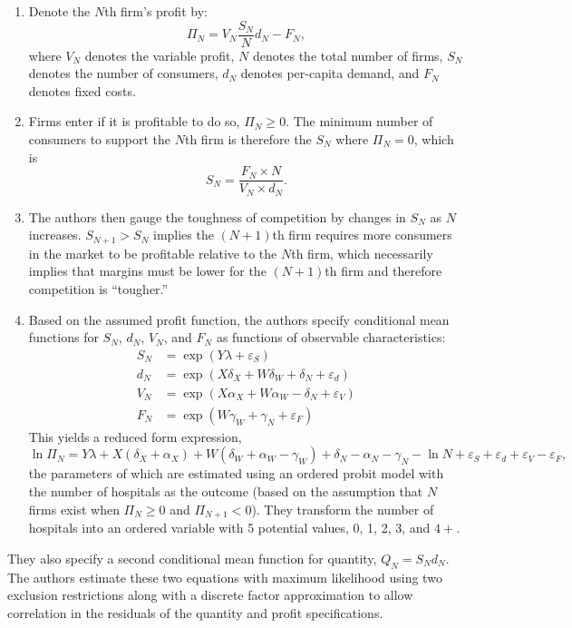 \documentclass[
  letterpaper,
  DIV=11,
  numbers=noendperiod]{scrreport}
\theoremstyle{definition}
\theoremstyle{remark}
\begin{document}
\begin{enumerate}
\def\labelenumi{\arabic{enumi}.}
\item
  Denote the \(N\)th firm's profit by:
  \[\Pi_{N}=V_{N}\frac{S_{N}}{N}d_{N} - F_{N},\] where \(V_{N}\) denotes
  the variable profit, \(N\) denotes the total number of firms,
  \(S_{N}\) denotes the number of consumers, \(d_{N}\) denotes
  per-capita demand, and \(F_{N}\) denotes fixed costs.
\item
  Firms enter if it is profitable to do so, \(\Pi_{N}\geq 0\). The
  minimum number of consumers to support the \(N\)th firm is therefore
  the \(S_{N}\) where \(\Pi_{N}=0\), which is
  \[S_{N}=\frac{F_{N}\times N}{V_{N}\times d_{N}}.\]
\item
  The authors then gauge the toughness of competition by changes in
  \(S_{N}\) as \(N\) increases. \(S_{N+1}>S_{N}\) implies the
  \((N+1)\)th firm requires more consumers in the market to be
  profitable relative to the \(N\)th firm, which necessarily implies
  that margins must be lower for the \((N+1)\)th firm and therefore
  competition is ``tougher.''
\item
  Based on the assumed profit function, the authors specify conditional
  mean functions for \(S_{N}\), \(d_{N}\), \(V_{N}\), and \(F_{N}\) as
  functions of observable characteristics: \[\begin{align*}
    S_{N} &= \exp \left(Y\lambda + \varepsilon_{S}\right) \\
    d_{N} &= \exp \left(X\delta_{X} + W\delta_{W} + \delta_{N} + \varepsilon_{d}\right) \\
    V_{N} &= \exp \left(X\alpha_{X} + W\alpha_{W} - \delta_{N} + \varepsilon_{V}\right) \\
    F_{N} &= \exp \left(W\gamma_{W} + \gamma_{N} + \varepsilon_{F}\right)
  \end{align*}\] This yields a reduced form expression,
  \[\ln \Pi_{N}=Y\lambda + X(\delta_{X}+\alpha_{X}) + W(\delta_{W}+\alpha_{W}-\gamma_{W}) + \delta_{N} - \alpha_{N} - \gamma_{N} - \ln N + \varepsilon_{S} + \varepsilon_{d} + \varepsilon_{V} - \varepsilon_{F},\]
  the parameters of which are estimated using an ordered probit model
  with the number of hospitals as the outcome (based on the assumption
  that \(N\) firms exist when \(\Pi_{N}\geq 0\) and \(\Pi_{N+1} < 0\)).
  They transform the number of hospitals into an ordered variable with 5
  potential values, 0, 1, 2, 3, and \(4+\).
\end{enumerate}

They also specify a second conditional mean function for quantity,
\(Q_{N}=S_{N}d_{N}\). The authors estimate these two equations with
maximum likelihood using two exclusion restrictions along with a
discrete factor approximation to allow correlation in the residuals of
the quantity and profit specifications.
\end{document}
